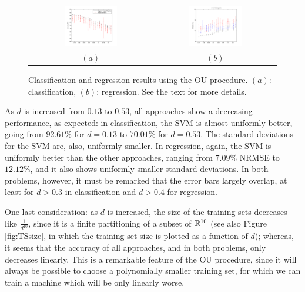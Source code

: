 \begin{figure}[!ht] \centering
  \begin{tabular}{cc}
    \includegraphics[width=0.45\textwidth]{figs/fig_all1} &
    \includegraphics[width=0.45\textwidth]{figs/fig_all2} \\
    $(a)$ & $(b)$ \\
  \end{tabular}
  \caption{Classification and regression results using the OU
  procedure. $(a)$: classification, $(b)$: regression. See the text
  for more details.}
  \label{fig:allres}
\end{figure}

As $d$ is increased from $0.13$ to $0.53$, all approaches show a
decreasing performance, as expected: in classification, the SVM is
almost uniformly better, going from $92.61\%$ for $d=0.13$ to
$70.01\%$ for $d=0.53$. The standard deviations for the SVM are, also,
uniformly smaller. In regression, again, the SVM is uniformly better
than the other approaches, ranging from $7.09\%$ NRMSE to $12.12\%$,
and it also shows uniformly smaller standard deviations. In both
problems, however, it must be remarked that the error bars largely
overlap, at least for $d>0.3$ in classification and $d>0.4$ for
regression.

One last consideration: as $d$ is increased, the size of the training
sets decreases like $\frac{1}{d^{10}}$, since it is a finite
partitioning of a subset of $\mathbb{R}^{10}$ (see also Figure
\ref{fig:TSsize}, in which the training set size is plotted as a
function of $d$); whereas, it seems that the accuracy of all
approaches, and in both problems, only decreases linearly. This is a
remarkable feature of the OU procedure, since it will always be
possible to choose a polynomially smaller training set, for which we
can train a machine which will be only linearly worse.

